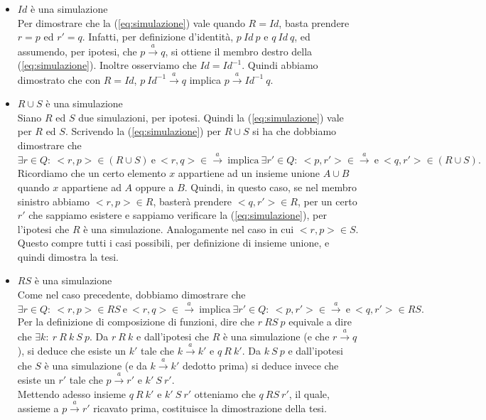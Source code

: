     \begin{itemize}
        \item $Id$ è una simulazione\\
            Per dimostrare che la (\ref{eq:simulazione}) vale quando $R=Id$, basta prendere $r=p$ ed $r'=q$. Infatti, per definizione d'identità, $p\ Id\ p$ e $q\ Id\ q$, ed assumendo, per ipotesi, che $p \xrightarrow{a} q$, si ottiene il membro destro della (\ref{eq:simulazione}). Inoltre osserviamo che $Id=Id^{-1}$. Quindi abbiamo dimostrato che con $R=Id$, $p\ Id^{-1}\xrightarrow{a} q$ implica $p \xrightarrow{a}Id^{-1}\ q$.
        \item $R \cup S$ è una simulazione\\
            Siano $R$ ed $S$ due simulazioni, per ipotesi. Quindi la (\ref{eq:simulazione}) vale per $R$ ed $S$. Scrivendo la (\ref{eq:simulazione}) per $R \cup S$ si ha che dobbiamo dimostrare che
            \begin{equation*}
                \exists r\in Q:\ <r,p>\in (R \cup S)\ \mbox{e}\ <r,q>\in\xrightarrow{a}\ \mbox{implica}\ \exists r'\in Q:\ <p,r'>\in\xrightarrow{a}\ \mbox{e}\ <q,r'>\in (R \cup S).
            \end{equation*}
            Ricordiamo che un certo elemento $x$ appartiene ad un insieme unione $A \cup B$ quando $x$ appartiene ad $A$ oppure a $B$. Quindi, in questo caso, se nel membro sinistro abbiamo $<r,p>\in R$, basterà prendere $<q,r'>\in R$, per un certo $r'$ che sappiamo esistere e sappiamo verificare la (\ref{eq:simulazione}), per l'ipotesi che $R$ è una simulazione. Analogamente nel caso in cui $<r,p> \in S$. Questo compre tutti i casi possibili, per definizione di insieme unione, e quindi dimostra la tesi.
        \item $RS$ è una simulazione\\
            Come nel caso precedente, dobbiamo dimostrare che
            \begin{equation*}
                \exists r\in Q:\ <r,p>\in RS\ \mbox{e}\ <r,q>\in\xrightarrow{a}\ \mbox{implica}\ \exists r'\in Q:\ <p,r'>\in\xrightarrow{a}\ \mbox{e}\ <q,r'>\in RS.
            \end{equation*}
            Per la definizione di composizione di funzioni, dire che $r\ RS\ p$ equivale a dire che $\exists k:\ r\ R\ k\ S\ p$. Da $r\ R\ k$ e dall'ipotesi che $R$ è una simulazione (e che $r \xrightarrow{a} q$), si deduce che esiste un $k'$ tale che $k \xrightarrow{a} k'$ e $q\ R\ k'$. Da $k\ S\ p$ e dall'ipotesi che $S$ è una simulazione (e da $k \xrightarrow{a} k'$ dedotto prima) si deduce invece che esiste un $r'$ tale che $p \xrightarrow{a} r'$ e $k'\ S\ r'$.\\
            Mettendo adesso insieme $q\ R\ k'$ e $k'\ S\ r'$ otteniamo che $q\ RS\ r'$, il quale, assieme a $p \xrightarrow{a} r'$ ricavato prima, costituisce la dimostrazione della tesi.
    \end{itemize}
    